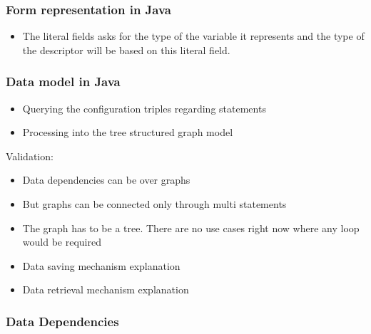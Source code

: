 

\subsubsection{Form representation in Java}


\begin{itemize}
	\item The literal fields asks for the type of the variable it represents and the type of the descriptor will be based on this literal field.
\end{itemize}



\subsubsection{Data model in Java}


\begin{itemize}
	\item Querying the configuration triples regarding statements
	\item Processing into the tree structured graph model
\end{itemize}



Validation:

\begin{itemize}
	\item Data dependencies can be over graphs
	\item But graphs can be connected only through multi statements
	\item The graph has to be a tree. There are no use cases right now where any loop would be required
\end{itemize}


\begin{itemize}
	\item Data saving mechanism explanation
	\item Data retrieval mechanism explanation
\end{itemize}

\subsubsection{Data Dependencies}


